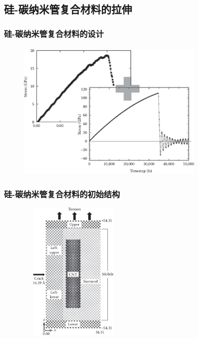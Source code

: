\subsection{硅-碳纳米管复合材料的拉伸}
\frame
{
	\frametitle{硅-碳纳米管复合材料的设计}
\begin{figure}[h!]
\centering
\vskip -8pt
\includegraphics[height=2.70in,width=3.6in, viewport=0 0 960 700,clip]{Figures/Lammps_tutorial-15-design_concept-for-the-Si-CNT.png}
\caption{\fontsize{6.2pt}{5.2pt}}%
\label{LAMMPS_Design_concept-for-Si_CNT.}
\end{figure}
}


\frame
{
	\frametitle{硅-碳纳米管复合材料的初始结构}
\begin{figure}[h!]
\centering
\vskip -10pt
\includegraphics[height=2.70in,width=2.1in, viewport=0 0 500 720,clip]{Figures/Lammps_tutorial-15-starting_structure-for-the-Si-CNT.png}
\caption{\fontsize{6.2pt}{5.2pt}}%
\label{LAMMPS_Starting-structure-of-Si_CNT.}
\end{figure}
}

